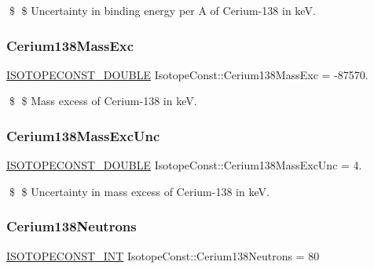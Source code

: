 \$ \$ Uncertainty in binding energy per A of Cerium-\/138 in keV. \mbox{\label{group___isotope_const-_cerium-_ce138_gabe66fd6299250ba29cdd0597ded063c3}} 
\subsubsection{\texorpdfstring{Cerium138\+Mass\+Exc}{Cerium138MassExc}}
{\footnotesize\ttfamily \mbox{\hyperlink{group___isotope_const-_macros_ga8f45a7272ce02c0b4c65c44636ed719a}{I\+S\+O\+T\+O\+P\+E\+C\+O\+N\+S\+T\+\_\+\+D\+O\+U\+B\+LE}} Isotope\+Const\+::\+Cerium138\+Mass\+Exc = -\/87570.}

\$ \$ Mass excess of Cerium-\/138 in keV. \mbox{\label{group___isotope_const-_cerium-_ce138_gaeefcd1ca5bdd3891baecbfe31e545790}} 
\subsubsection{\texorpdfstring{Cerium138\+Mass\+Exc\+Unc}{Cerium138MassExcUnc}}
{\footnotesize\ttfamily \mbox{\hyperlink{group___isotope_const-_macros_ga8f45a7272ce02c0b4c65c44636ed719a}{I\+S\+O\+T\+O\+P\+E\+C\+O\+N\+S\+T\+\_\+\+D\+O\+U\+B\+LE}} Isotope\+Const\+::\+Cerium138\+Mass\+Exc\+Unc = 4.}

\$ \$ Uncertainty in mass excess of Cerium-\/138 in keV. \mbox{\label{group___isotope_const-_cerium-_ce138_gaa05a3bcb5ff16308971641d94ded1a63}} 
\subsubsection{\texorpdfstring{Cerium138\+Neutrons}{Cerium138Neutrons}}
{\footnotesize\ttfamily \mbox{\hyperlink{group___isotope_const-_macros_ga5f18360b3e99483a35c32d789e62621c}{I\+S\+O\+T\+O\+P\+E\+C\+O\+N\+S\+T\+\_\+\+I\+NT}} Isotope\+Const\+::\+Cerium138\+Neutrons = 80}

